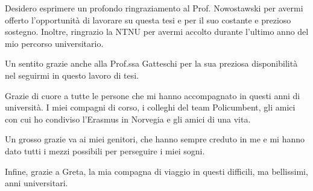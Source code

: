 Desidero esprimere un profondo ringraziamento al Prof. Nowostawski per avermi offerto l'opportunità di lavorare su questa tesi e per il suo costante e prezioso sostegno. Inoltre, ringrazio la NTNU per avermi accolto durante l'ultimo anno del mio percorso universitario.

Un sentito grazie anche alla Prof.ssa Gatteschi per la sua preziosa disponibilità nel seguirmi in questo lavoro di tesi.

Grazie di cuore a tutte le persone che mi hanno accompagnato in questi anni di università. I miei compagni di corso, i colleghi del team Policumbent, gli amici con cui ho condiviso l’Erasmus in Norvegia e gli amici di una vita. 

Un grosso grazie va ai miei genitori, che hanno sempre creduto in me e mi hanno dato tutti i mezzi possibili per perseguire i miei sogni.

Infine, grazie a  Greta, la mia compagna di viaggio in questi difficili, ma bellissimi, anni universitari.